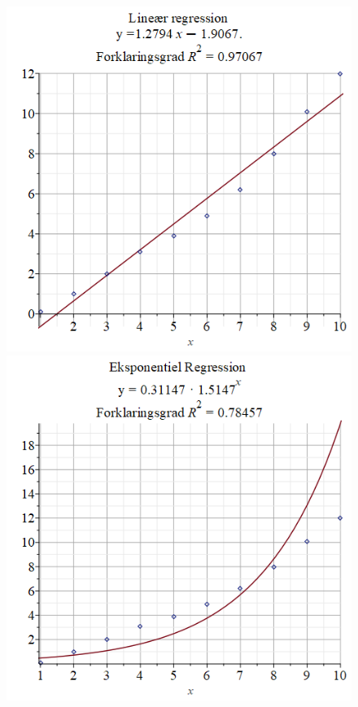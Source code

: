 \begin{exa}
\begin{figure}[H]
\centering
\includegraphics[width = \textwidth*4/10]{Billeder/linreg.png}
\includegraphics[width = \textwidth*4/10]{Billeder/expreg3.png}

\end{figure}
\end{exa}
